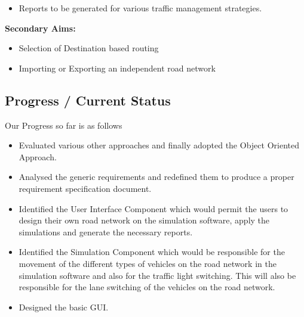 \documentclass[11pt]{article}
\begin{document}
\begin{itemize}
\item Reports to be generated for various traffic management strategies.
\end{itemize}

\textbf{Secondary Aims:}

\begin{itemize}
\item Selection of Destination based routing
\end{itemize}

\begin{itemize}
\item Importing or Exporting an independent road network
\end{itemize}

\subsection{Progress / Current Status}

Our Progress so far is as follows

\begin{itemize}
\item Evaluated various other approaches and finally adopted the Object Oriented Approach.
\end{itemize}

\begin{itemize}
\item Analysed the generic requirements and redefined them to produce a proper requirement specification document.
\end{itemize}

\begin{itemize}
\item Identified the User Interface Component which would permit the users to design their own road network on the simulation software, apply the simulations and generate the necessary reports.
\end{itemize}

\begin{itemize}
\item Identified the Simulation Component which would be responsible for the movement of the different types of vehicles on the road network in the simulation software and also for the traffic light switching. This will also be responsible for the lane switching of the vehicles on the road network.
\end{itemize}

\begin{itemize}
\item Designed the basic GUI.
\end{itemize}
\end{document}
